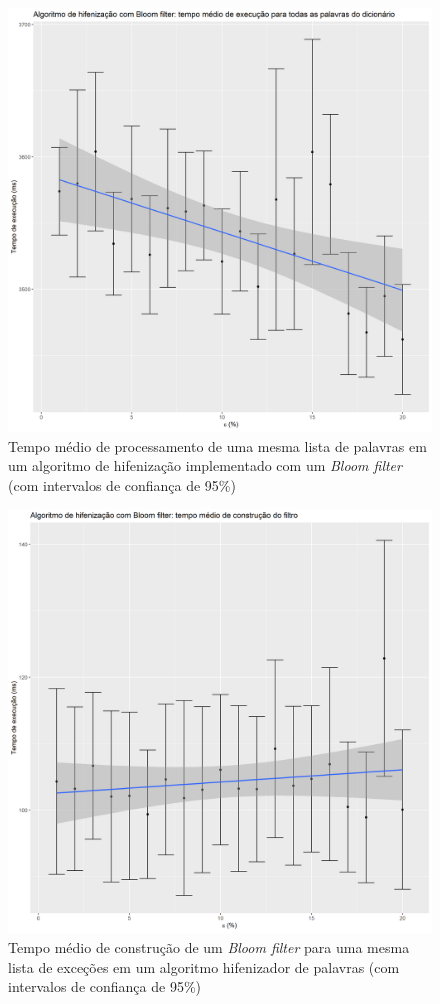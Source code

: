 \documentclass[12pt,twoside,english,brazilian]{book}
\begin{document}
\begin{figure}
    \begin{center}
        \includegraphics[width=0.8\linewidth]{img/bloom-filter.png}
        \caption{\label{three-layer} Tempo médio de processamento de uma mesma lista de palavras em um algoritmo de hifenização implementado com um \textit{Bloom filter} (com intervalos de confiança de 95\%)}
    \end{center}
\end{figure}

\begin{figure}
    \begin{center}
        \includegraphics[width=0.8\linewidth]{img/build-bloom-filter.png}
        \caption{\label{three-layer} Tempo médio de construção de um \textit{Bloom filter} para uma mesma lista de exceções em um algoritmo hifenizador de palavras (com intervalos de confiança de 95\%)}
    \end{center}
\end{figure}
\end{document}
